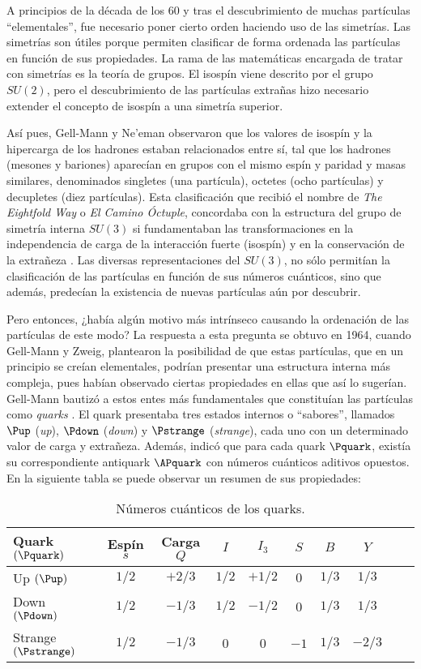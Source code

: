 A principios de la década de los 60 y tras el descubrimiento de muchas partículas ``elementales'', fue necesario poner cierto orden haciendo uso de las simetrías. Las simetrías son útiles porque permiten clasificar de forma ordenada las partículas en función de sus propiedades. La rama de las matemáticas encargada de tratar con simetrías es la teoría de grupos. El isospín viene descrito por el grupo $SU(2)$, pero el descubrimiento de las partículas extrañas hizo necesario extender el concepto de isospín a una simetría superior.

Así pues, Gell-Mann y Ne'eman observaron que los valores de isospín y la hipercarga de los hadrones estaban relacionados entre sí, tal que los hadrones (mesones y bariones) aparecían en grupos con el mismo espín y paridad y masas similares, denominados singletes (una partícula), octetes (ocho partículas) y decupletes (diez partículas).  Esta clasificación que recibió el nombre de \textit{The Eightfold Way} o \textit{El Camino Óctuple}, concordaba con la estructura del grupo de simetría interna $SU(3)$ si fundamentaban las transformaciones en la independencia de carga de la interacción fuerte (isospín) y en la conservación de la extrañeza \cite{notas2020}. Las diversas representaciones del $SU(3)$, no sólo permitían la clasificación de las partículas en función de sus números cuánticos, sino que además, predecían la existencia de nuevas partículas aún por descubrir. 

Pero entonces, ¿había algún motivo más intrínseco causando la ordenación de las partículas de este modo? La respuesta a esta pregunta se obtuvo en 1964, cuando Gell-Mann y Zweig, plantearon la posibilidad de que estas partículas, que en un principio se creían elementales, podrían presentar una estructura interna más compleja, pues habían observado ciertas propiedades en ellas que así lo sugerían. Gell-Mann bautizó a estos entes más fundamentales que constituían las partículas como \textit{quarks} \cite{Griffiths2008}. El quark presentaba tres estados internos o ``sabores'', llamados $\Pup$ (\textit{up}), $\Pdown$ (\textit{down}) y $\Pstrange$ (\textit{strange}), cada uno con un determinado valor de carga y extrañeza. Además, indicó que para cada quark $\Pquark$, existía su correspondiente antiquark $\APquark$ con números cuánticos aditivos opuestos. En la siguiente tabla se puede observar un resumen de sus propiedades:

\begin{table}[h!]
	\centering
	\begin{tabular}{l*{8}{c}r}
\hline
Quark $(\Pquark)$ & Espín $s$ & Carga $Q$ & $I$ & $I_3$ & $S$ & $B$ & $Y$\\ 
\hline
Up $(\Pup)$ & $1/2$ & $+2/3$ & $1/2$ & $+1/2$ & $0$ & $1/3$ & $1/3$\\
Down $(\Pdown)$ & $1/2$ & $-1/3$ & $1/2$ & $-1/2$ & $0$ & $1/3$ & $1/3$\\
Strange $(\Pstrange)$ & $1/2$ & $-1/3$ & $0$ & $0$ & $-1$ & $1/3$ & $-2/3$\\
\hline
	\end{tabular}
\caption[Números cuánticos de los quarks]{Números cuánticos de los quarks. \cite{notas2020}} %
\label{tab:propiedades_quarks}
\end{table}

